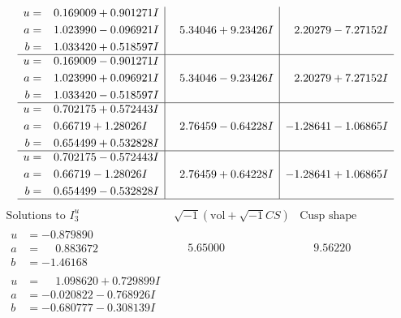 \documentclass[1p]{elsarticle_modified}
\theoremstyle{definition}
\newcommand{\I}{\sqrt{-1}}
\begin{document}
$$\begin{array}{c|c|c}
\begin{aligned}
u &= \phantom{-}0.169009 + 0.901271 I \\
a &= \phantom{-}1.023990 - 0.096921 I \\
b &= \phantom{-}1.033420 + 0.518597 I\end{aligned}
 & \phantom{-}5.34046 + 9.23426 I & \phantom{-}2.20279 - 7.27152 I \\ \hline\begin{aligned}
u &= \phantom{-}0.169009 - 0.901271 I \\
a &= \phantom{-}1.023990 + 0.096921 I \\
b &= \phantom{-}1.033420 - 0.518597 I\end{aligned}
 & \phantom{-}5.34046 - 9.23426 I & \phantom{-}2.20279 + 7.27152 I \\ \hline\begin{aligned}
u &= \phantom{-}0.702175 + 0.572443 I \\
a &= \phantom{-}0.66719 + 1.28026 I \\
b &= \phantom{-}0.654499 + 0.532828 I\end{aligned}
 & \phantom{-}2.76459 - 0.64228 I & -1.28641 - 1.06865 I \\ \hline\begin{aligned}
u &= \phantom{-}0.702175 - 0.572443 I \\
a &= \phantom{-}0.66719 - 1.28026 I \\
b &= \phantom{-}0.654499 - 0.532828 I\end{aligned}
 & \phantom{-}2.76459 + 0.64228 I & -1.28641 + 1.06865 I\\
 \hline 
 \end{array}$$\newpage$$\begin{array}{c|c|c}  
\text{Solutions to }I^u_{3}& \I (\text{vol} + \sqrt{-1}CS) & \text{Cusp shape}\\
 \hline 
\begin{aligned}
u &= -0.879890\phantom{ +0.000000I} \\
a &= \phantom{-}0.883672\phantom{ +0.000000I} \\
b &= -1.46168\phantom{ +0.000000I}\end{aligned}
 & \phantom{-}5.65000\phantom{ +0.000000I} & \phantom{-}9.56220\phantom{ +0.000000I} \\ \hline\begin{aligned}
u &= \phantom{-}1.098620 + 0.729899 I \\
a &= -0.020822 - 0.768926 I \\
b &= -0.680777 - 0.308139 I\end{aligned}

\end{array}$$
\end{document}
